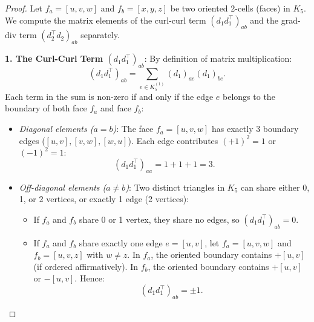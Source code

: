 \begin{proof}
Let $f_a = [u, v, w]$ and $f_b = [x, y, z]$ be two oriented 2-cells (faces) in $K_5$. We compute the matrix elements of the curl-curl term $(d_1 d_1^\top)_{ab}$ and the grad-div term $(d_2^\top d_2)_{ab}$ separately.

\textbf{1. The Curl-Curl Term $(d_1 d_1^\top)_{ab}$}:
By definition of matrix multiplication:
\begin{equation}
(d_1 d_1^\top)_{ab} = \sum_{e \in K_5^{(1)}} (d_1)_{ae} (d_1)_{be}.
\end{equation}
Each term in the sum is non-zero if and only if the edge $e$ belongs to the boundary of both face $f_a$ and face $f_b$:
\begin{itemize}
    \item \emph{Diagonal elements ($a = b$)}: The face $f_a = [u, v, w]$ has exactly 3 boundary edges ($[u, v], [v, w], [w, u]$). Each edge contributes $(+1)^2 = 1$ or $(-1)^2 = 1$:
    \begin{equation}
    (d_1 d_1^\top)_{aa} = 1 + 1 + 1 = 3.
    \end{equation}
    \item \emph{Off-diagonal elements ($a \neq b$)}: Two distinct triangles in $K_5$ can share either 0, 1, or 2 vertices, or exactly 1 edge (2 vertices):
    \begin{itemize}
        \item If $f_a$ and $f_b$ share 0 or 1 vertex, they share no edges, so $(d_1 d_1^\top)_{ab} = 0$.
        \item If $f_a$ and $f_b$ share exactly one edge $e = [u, v]$, let $f_a = [u, v, w]$ and $f_b = [u, v, z]$ with $w \neq z$. In $f_a$, the oriented boundary contains $+[u, v]$ (if ordered affirmatively). In $f_b$, the oriented boundary contains $+[u, v]$ or $-[u, v]$. Hence:
        \begin{equation}
        (d_1 d_1^\top)_{ab} = \pm 1.
        \end{equation}
    \end{itemize}
\end{itemize}


\end{proof}
